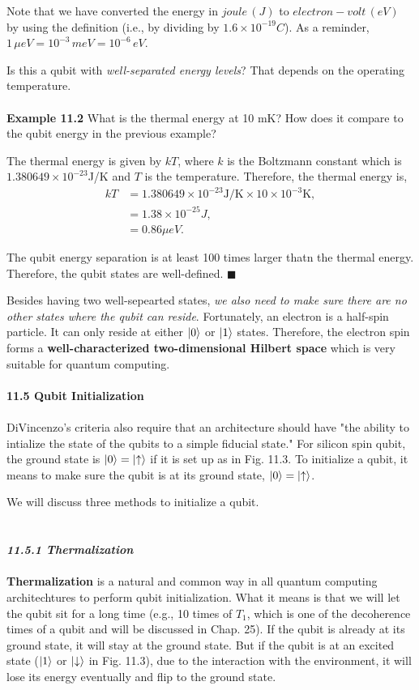\documentclass{article}
\newcommand{\bfit}[1]{\textit{\textbf{#1}}}
\begin{document}
Note that we have converted the energy in $joule\, (J)$ to $electron-volt\, (eV)$
by using the definition (i.e., by dividing by $1.6 \times 10^{-19}C$). As a reminder, 
$1\, \mu eV=10^{-3}\, meV=10^{-6}\, eV$.

Is this a qubit with \textit{well-separated energy levels}? That depends on the operating temperature.
\\\\
\textbf{Example 11.2} What is the thermal energy at 10 mK? How does it compare to the qubit
energy in the previous example?

The thermal energy is given by $kT$, where $k$ is the Boltzmann constant which is
$1.380649\times10^{-23}$J/K and $T$ is the temperature. Therefore, the thermal energy is,
\begin{align*}\label{eq 11.4}
    kT&=1.380649\times10^{-23}\text{J/K}\times10\times10^{-3}\text{K},\\
    &=1.38\times10^{-25}J,\\
    &=0.86\mu eV.\tag{11.4}
\end{align*}

The qubit energy separation is at least 100 times larger thatn the thermal energy.
Therefore, the qubit states are well-defined. \hfill $\blacksquare$

Besides having two well-sepearted states, \textit{we also need to make sure there are no
other states where the qubit can reside}. Fortunately, an electron is a half-spin particle.
It can only reside at either $\ket{0}$ or $\ket{1}$ states. Therefore, the electron spin forms
a \textbf{well-characterized two-dimensional Hilbert space} which is very suitable for quantum computing.\\\\
\textbf{\large 11.5 Qubit Initialization}\\\\
DiVincenzo's criteria also require that an architecture should have "the ability to
intialize the state of the qubits to a simple fiducial state." For silicon spin qubit, the ground
state is $\ket{0}=\ket{\uparrow}$ if it is set up as in Fig. 11.3. To initialize a qubit, it means to make
sure the qubit is at its ground state, $\ket{0}=\ket{\uparrow}$.

We will discuss three methods to initialize a qubit.\\\\\\
\bfit{\large 11.5.1 Thermalization}\\\\
\textbf{Thermalization} is a natural and common way in all quantum computing architechtures to perform
qubit initialization. What it means is that we will let the qubit sit for a long time (e.g., 10 times of
$T_1$, which is one of the decoherence times of a qubit and will be discussed in Chap. 25).
If the qubit is already at its ground state, it will stay at the ground state. But if the qubit is at an
excited state ($\ket{1}$ or $\ket{\downarrow}$ in Fig. 11.3), due to the interaction with the environment,
it will lose its energy eventually and flip to the ground state.
\end{document}
